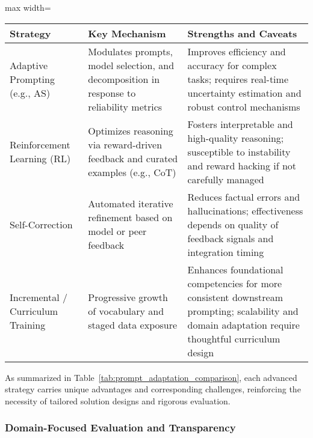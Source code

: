 \documentclass[sigconf]{acmart}
\begin{document}
\begin{table*}[htbp]
\centering
\caption{Comparison of Advanced Prompting and Adaptation Strategies}
\label{tab:prompt_adaptation_comparison}
\begin{adjustbox}{max width=\textwidth}
\begin{tabular}{lll}
\toprule
\textbf{Strategy} & \textbf{Key Mechanism} & \textbf{Strengths and Caveats} \\
\midrule
Adaptive Prompting (e.g., AS) & Modulates prompts, model selection, and decomposition in response to reliability metrics & Improves efficiency and accuracy for complex tasks; requires real-time uncertainty estimation and robust control mechanisms \\
Reinforcement Learning (RL) & Optimizes reasoning via reward-driven feedback and curated examples (e.g., CoT) & Fosters interpretable and high-quality reasoning; susceptible to instability and reward hacking if not carefully managed \\
Self-Correction & Automated iterative refinement based on model or peer feedback & Reduces factual errors and hallucinations; effectiveness depends on quality of feedback signals and integration timing \\
Incremental / Curriculum Training & Progressive growth of vocabulary and staged data exposure & Enhances foundational competencies for more consistent downstream prompting; scalability and domain adaptation require thoughtful curriculum design \\
\bottomrule
\end{tabular}
\end{adjustbox}
\end{table*}

As summarized in Table~\ref{tab:prompt_adaptation_comparison}, each advanced strategy carries unique advantages and corresponding challenges, reinforcing the necessity of tailored solution designs and rigorous evaluation.

\subsubsection{Domain-Focused Evaluation and Transparency}
\end{document}
